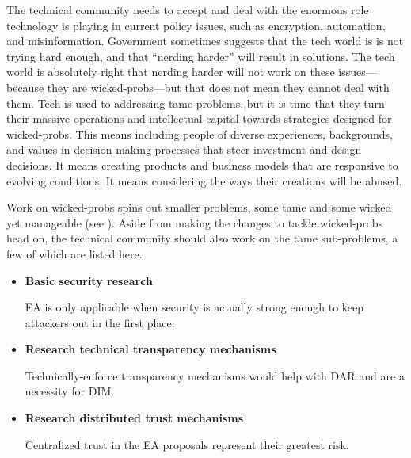 The technical community needs to accept and deal with the enormous role technology is playing in current policy issues,
such as encryption, automation, and misinformation. Government sometimes suggests that the tech world is is not trying
hard enough, and that ``nerding harder'' will result in solutions. The tech world is absolutely right that nerding
harder will not work on these issues---because they are \acp{wicked-prob}---but that does not mean they cannot deal with
them. Tech is used to addressing tame problems, but it is time that they turn their massive operations and intellectual
capital towards strategies designed for \acp{wicked-prob}. This means including people of diverse experiences,
backgrounds, and values in decision making processes that steer investment and design decisions. It means creating
products and business models that are responsive to evolving conditions. It means considering the ways their creations
will be abused.

Work on \acp{wicked-prob} spins out smaller problems, some tame and some wicked yet manageable (see
). Aside from making the changes to tackle \acp{wicked-prob} head on, the technical
community should also work on the tame sub-problems, a few of which are listed here.

\newcommand{\taskstart}[0]{\begin{itemize}}
\newcommand{\taskitem}[2]{ %
    \item \textbf{#1} \nopagebreak

    \vspace{0.5\baselineskip} \parbox{\linewidth}{#2} \vspace{0.5\baselineskip}
}
\newcommand{\taskend}{\end{itemize}}

\taskstart
    \taskitem{Basic security research}{

\ac{EA} is only applicable when security is actually strong enough to keep attackers out in the first place.

}

    \taskitem{Research technical transparency mechanisms}{

Technically-enforce transparency mechanisms would help with \ac{DAR} and are a necessity for \ac{DIM}.

}

    \taskitem{Research distributed trust mechanisms}{

Centralized trust in the \ac{EA} proposals represent their greatest risk.

}
\taskend

